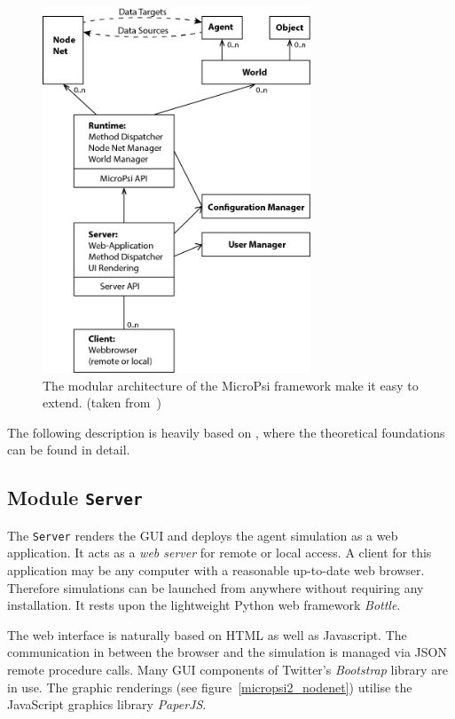 \begin{figure}[h]
  \centering
    \includegraphics[width=8cm]{graphics/micropsi2_uml}
  \caption{The modular architecture of the MicroPsi framework make it easy to extend. (taken from~\cite{conf/agi/Bach12})}
  \label{micropsi2_modules}
\end{figure}

The following description is heavily based on \cite{conf/agi/Bach12}, where the theoretical foundations can be found in detail.

        \subsection{Module \texttt{Server}}
The \texttt{Server} renders the GUI and deploys the agent simulation as a web application. It acts as a \emph{web server} for remote or local access. A client for this application may be any computer with a reasonable up-to-date web browser. Therefore simulations can be launched from anywhere without requiring any installation. It rests upon the lightweight Python web framework \emph{Bottle}.

The web interface is naturally based on HTML as well as Javascript. The communication in between the browser and the simulation is managed via JSON remote procedure calls. Many GUI components of Twitter's \emph{Bootstrap} library are in use. The graphic renderings (see figure~\ref{micropsi2_nodenet}) utilise the JavaScript graphics library \emph{PaperJS}. 

